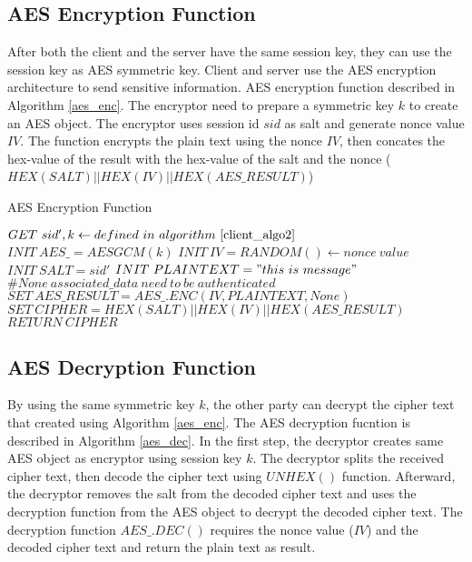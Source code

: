 \subsection{AES Encryption Function}
\label{subsec:aes_enc}

After both the client and the server have the same session key, they can use the session key as AES symmetric key. Client and server use the AES encryption architecture to send sensitive information. AES encryption function described in Algorithm \ref{aes_enc}. The encryptor need to prepare a symmetric key $k$ to create an AES object. The encryptor uses session id $sid$ as salt and generate nonce value $IV$. The function encrypts the plain text using the nonce $IV$, then concates the hex-value of the result with the hex-value of the salt and the nonce ($HEX(SALT)||HEX(IV)||HEX(AES\_RESULT)$)

\begin{algorithm}[H]
	\caption{AES Encryption Function}\label{aes_enc}
	\begin{algorithmic}[1]
		\State $GET\ sid', k \gets defined\ in\ algorithm\ \ref{client_algo2}$
		\State $INIT\ AES\_ = AESGCM(k)$
		\State $INIT\ IV = RANDOM() \gets nonce\ value$
		\State $INIT\ SALT = sid'$
		\State $INIT\ PLAINTEXT = "this\ is\ message"$
		\State $\#None\ associated\_data\ need\ to\ be\ authenticated$
		\State $SET\ AES\_RESULT = AES\_.ENC(IV,PLAINTEXT,None) $
		\State $SET\ CIPHER = HEX(SALT)||HEX(IV)||HEX(AES\_RESULT)$
		\State $RETURN\ CIPHER$
		\EndProcedure
	\end{algorithmic}
\end{algorithm}

\subsection{AES Decryption Function}
\label{subsec:aes_dec}

By using the same symmetric key $k$, the other party can decrypt the cipher text that created using Algorithm \ref{aes_enc}. The AES decryption fucntion is described in Algorithm \ref{aes_dec}. In the first step, the decryptor creates same AES object as encryptor using session key $k$. The decryptor splits the received cipher text, then decode the cipher text using $UNHEX()$ function. Afterward, the decryptor removes the salt from the decoded cipher text and uses the decryption function from the AES object to decrypt the decoded cipher text. The decryption function $AES\_.DEC()$ requires the nonce value ($IV$) and the decoded cipher text and return the plain text as result.

